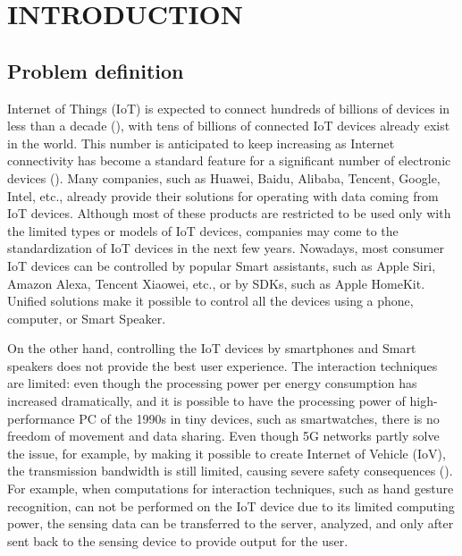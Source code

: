 
\chapter{INTRODUCTION}

\section{Problem definition}

Internet of Things (IoT) is expected to connect hundreds of billions of devices in less than a decade (\cite{simiscuka_synchronisation_2018}), with tens of billions of connected IoT devices already exist in the world. This number is anticipated to keep increasing as Internet connectivity has become a standard feature for a significant number of electronic devices (\cite{hu_virtual_2021}). Many companies, such as Huawei, Baidu, Alibaba, Tencent, Google, Intel, etc., already provide their solutions for operating with data coming from IoT devices. Although most of these products are restricted to be used only with the limited types or models of IoT devices, companies may come to the standardization of IoT devices in the next few years. Nowadays, most consumer IoT devices can be controlled by popular Smart assistants, such as Apple Siri, Amazon Alexa, Tencent Xiaowei, etc., or by SDKs, such as Apple HomeKit. Unified solutions make it possible to control all the devices using a phone, computer, or Smart Speaker.

On the other hand, controlling the IoT devices by smartphones and Smart speakers does not provide the best user experience. The interaction techniques are limited: even though the processing power per energy consumption has increased dramatically, and it is possible to have the processing power of high-performance PC of the 1990s in tiny devices, such as smartwatches, there is no freedom of movement and data sharing. Even though 5G networks partly solve the issue, for example, by making it possible to create Internet of Vehicle (IoV), the transmission bandwidth is still limited, causing severe safety consequences (\cite{hu_virtual_2021}). For example, when computations for interaction techniques, such as hand gesture recognition, can not be performed on the IoT device due to its limited computing power, the sensing data can be transferred to the server, analyzed, and only after sent back to the sensing device to provide output for the user.

